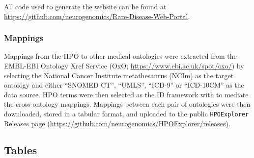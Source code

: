 \documentclass[
]{article}
\begin{document}
All code used to generate the website can be found at
\url{https://github.com/neurogenomics/Rare-Disease-Web-Portal}.

\subsubsection{Mappings}\label{mappings-1}

Mappings from the HPO to other medical ontologies were extracted from
the EMBL-EBI Ontology Xref Service (OxO;
\url{https://www.ebi.ac.uk/spot/oxo/}) by selecting the National Cancer
Institute metathesaurus (NCIm) as the target ontology and either
``SNOMED CT'', ``UMLS'', ``ICD-9'' or ``ICD-10CM'' as the data source.
HPO terms were then selected as the ID framework with to mediate the
cross-ontology mappings. Mappings between each pair of ontologies were
then downloaded, stored in a tabular format, and uploaded to the public
\texttt{HPOExplorer} Releases page
(\url{https://github.com/neurogenomics/HPOExplorer/releases}).

\newpage{}

\subsection{Tables}\label{tables}
\end{document}
